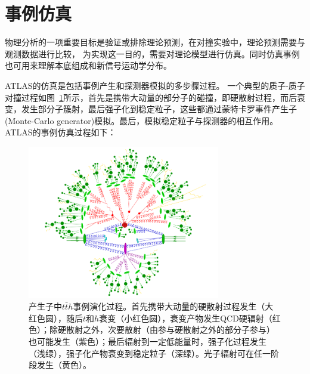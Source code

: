 \section{事例仿真}\label{sec:evt_simulation}
物理分析的一项重要目标是验证或排除理论预测，在对撞实验中，理论预测需要与观测数据进行比较，
为实现这一目的，需要对理论模型进行仿真。同时仿真事例也可用来理解本底组成和新信号运动学分布。

ATLAS的仿真是包括事例产生和探测器模拟的多步骤过程。
一个典型的质子-质子对撞过程如图~\ref{fig:evt_egen_chain}所示，首先是携带大动量的部分子的碰撞，即硬散射过程，而后衰变，发生部分子簇射，最后强子化到稳定粒子，这些都通过蒙特卡罗事件产生子(Monte-Carlo generator)模拟\cite{BUCKLEY2011145}。最后，模拟稳定粒子与探测器的相互作用。ATLAS的事例仿真过程如下：
\begin{figure}
\centering
\includegraphics[width=0.75\textwidth]{fig/evt_egen_chain.png}
\caption{产生子中$t\bar{t}h$事例演化过程\cite{Gleisberg:2008ta}。首先携带大动量的硬散射过程发生（大红色圆），随后$t$和$h$衰变（小红色圆），衰变产物发生QCD硬辐射（红色）；除硬散射之外，次要散射（由参与硬散射之外的部分子参与）也可能发生（紫色）；最后辐射到一定低能量时，强子化过程发生（浅绿），强子化产物衰变到稳定粒子（深绿）。光子辐射可在任一阶段发生（黄色）。}
\label{fig:evt_egen_chain}
\end{figure}

